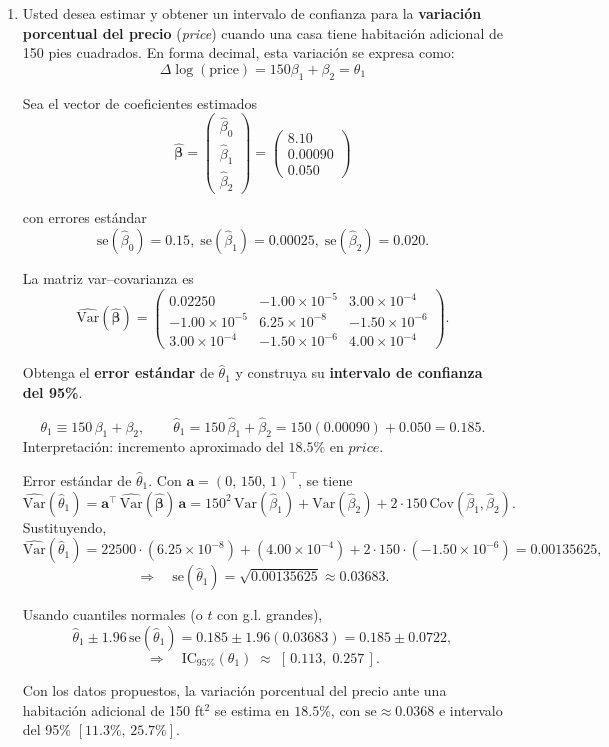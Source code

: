 \documentclass[11pt]{article}
\begin{document}
\begin{enumerate}
    \item Usted desea estimar y obtener un intervalo de confianza para la \textbf{variación porcentual del precio} (\textit{price}) cuando una casa tiene habitación adicional de 150 pies cuadrados. En forma decimal, esta variación se expresa como:
    \[
    \Delta \log(\text{price}) = 150\beta_1 + \beta_2=\theta_1
    \]

    Sea el vector de coeficientes estimados
\[
\hat{\boldsymbol\beta}=
\begin{pmatrix}
\hat\beta_0\\ \hat\beta_1\\ \hat\beta_2
\end{pmatrix}
=
\begin{pmatrix}
8.10\\ 0.00090\\ 0.050
\end{pmatrix}\]


{con errores estándar } 
\[\text{se}(\hat\beta_0)=0.15,\;
\text{se}(\hat\beta_1)=0.00025,\;
\text{se}(\hat\beta_2)=0.020.
\]

La matriz var--covarianza es
\[
\widehat{\mathrm{Var}}(\hat{\boldsymbol\beta})=
\begin{pmatrix}
0.02250 & -1.00\times 10^{-5} & 3.00\times 10^{-4}\\
-1.00\times 10^{-5} & 6.25\times 10^{-8} & -1.50\times 10^{-6}\\
3.00\times 10^{-4} & -1.50\times 10^{-6} & 4.00\times 10^{-4}
\end{pmatrix}.
\]


Obtenga el \textbf{error estándar} de $\hat{\theta}_1$ y construya  su \textbf{intervalo de confianza del 95\%}.



{\color{blue}

\[
\theta_1 \equiv 150\,\beta_1 + \beta_2, 
\qquad 
\hat\theta_1=150\,\hat\beta_1+\hat\beta_2
=150(0.00090)+0.050=0.185.
\]
Interpretación: incremento aproximado del \(18.5\%\) en \(\textit{price}\).

{Error estándar de \(\hat\theta_1\).}
Con \(\mathbf{a}=(0,\,150,\,1)^\top\), se tiene
\[
\widehat{\mathrm{Var}}(\hat\theta_1)=
\mathbf{a}^\top\,\widehat{\mathrm{Var}}(\hat{\boldsymbol\beta})\,\mathbf{a}
=150^2\,\mathrm{Var}(\hat\beta_1)+\mathrm{Var}(\hat\beta_2)+2\cdot150\,\mathrm{Cov}(\hat\beta_1,\hat\beta_2).
\]
Sustituyendo,
\[
\widehat{\mathrm{Var}}(\hat\theta_1)=
22500\cdot(6.25\times10^{-8})+ (4.00\times10^{-4})
+ 2\cdot150\cdot(-1.50\times10^{-6})
=0.00135625,
\]
\[
\Rightarrow\quad \text{se}(\hat\theta_1)=\sqrt{0.00135625}\approx 0.03683.
\]


Usando cuantiles normales (o \(t\) con g.l. grandes),
\[
\hat\theta_1 \pm 1.96\,\text{se}(\hat\theta_1)
= 0.185 \pm 1.96(0.03683)
= 0.185 \pm 0.0722,
\]
\[
\Rightarrow\quad \text{IC}_{95\%}(\theta_1)\;\approx\;[\,0.113,\;0.257\,].
\]

Con los datos propuestos, la variación porcentual del precio ante una habitación adicional de 150 ft\(^2\) se estima en \(18.5\%\), con \(\text{se}\approx 0.0368\) e intervalo del 95\% \([11.3\%,\,25.7\%]\).
}

\end{enumerate}
\end{document}
